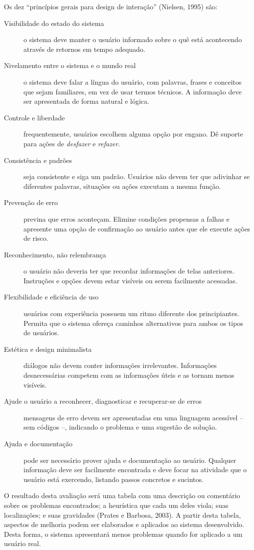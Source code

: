 Os dez “princípios gerais para design de interação” (Nielsen, 1995) são:
\begin{description}
	\item [Visibilidade do estado do sistema] o sistema deve manter o usuário informado sobre o quê está acontecendo através de retornos em tempo adequado.
	\item [Nivelamento entre o sistema e o mundo real] o sistema deve falar a língua do usuário, com palavras, frases e conceitos que sejam familiares, em vez de usar termos técnicos. A informação deve ser apresentada de forma natural e lógica.
	\item [Controle e liberdade] frequentemente, usuários escolhem alguma opção por engano. Dê suporte para ações de \emph{desfazer} e \emph{refazer}.
	\item [Consistência e padrões] seja consistente e siga um padrão. Usuários não devem ter que adivinhar se diferentes palavras, situações ou ações executam a mesma função.
	\item [Prevenção de erro] previna que erros aconteçam. Elimine condições propensas a falhas e apresente uma opção de confirmação ao usuário antes que ele execute ações de risco.
	\item [Reconhecimento, não relembrança] o usuário não deveria ter que recordar informações de telas anteriores. Instruções e opções devem estar visíveis ou serem facilmente acessadas.
	\item [Flexibilidade e eficiência de uso] usuários com experiência possuem um ritmo diferente dos principiantes. Permita que o sistema ofereça caminhos alternativos para ambos os tipos de usuários.
	\item [Estética e design minimalista] diálogos não devem conter informações irrelevantes. Informações desnecessárias competem com as informações úteis e as tornam menos visíveis.
	\item [Ajude o usuário a reconhecer, diagnosticar e recuperar-se de erros] mensagens de erro devem ser apresentadas em uma linguagem acessível -- sem códigos --, indicando o problema e uma sugestão de solução.
	\item [Ajuda e documentação] pode ser necessário prover ajuda e documentação ao usuário. Qualquer informação deve ser facilmente encontrada e deve focar na atividade que o usuário está exercendo, listando passos concretos e sucintos.
\end{description}

O resultado desta avaliação será uma tabela com uma descrição ou comentário sobre os problemas encontrados; a heurística que cada um deles viola; suas localizações; e suas gravidades (Prates e Barbosa, 2003)\nocite{PRATES2003}. A partir desta tabela, aspectos de melhoria podem ser elaborados e aplicados ao sistema desenvolvido. Desta forma, o sistema apresentará menos problemas quando for aplicado a um usuário real.

